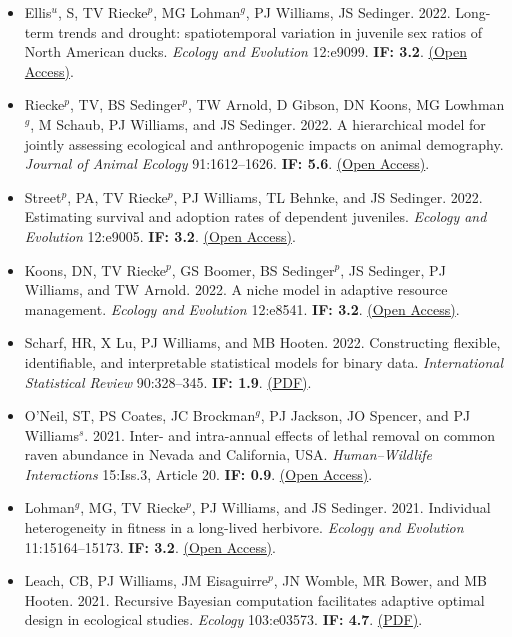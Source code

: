 \begin{itemize}
\item Ellis$^u$, S, TV Riecke$^p$, MG Lohman$^g$, PJ Williams, JS Sedinger. 2022. Long-term trends and drought: spatiotemporal variation in juvenile sex ratios of North American ducks. \emph{Ecology and Evolution} 12:e9099. \textbf{IF: 3.2}. \href{https://onlinelibrary.wiley.com/doi/10.1002/ece3.9099}{(Open Access)}.
\item Riecke$^p$, TV, BS Sedinger$^p$, TW Arnold, D Gibson, DN Koons, MG Lowhman$^g$, M Schaub, PJ Williams, and JS Sedinger. 2022. A hierarchical model for jointly assessing ecological and anthropogenic impacts on animal demography. \emph{Journal of Animal Ecology} 91:1612--1626. \textbf{IF: 5.6}. \href{https://besjournals.onlinelibrary.wiley.com/doi/10.1111/1365-2656.13747}{(Open Access)}.
\item Street$^p$, PA, TV Riecke$^p$, PJ Williams, TL Behnke, and JS Sedinger. 2022. Estimating survival and adoption rates of dependent juveniles. \emph{Ecology and Evolution} 12:e9005. \textbf{IF: 3.2}. \href{https://onlinelibrary.wiley.com/doi/10.1002/ece3.9005}{(Open Access)}.
\item Koons, DN, TV Riecke$^p$, GS Boomer, BS Sedinger$^p$, JS Sedinger, PJ Williams, and TW Arnold. 2022. A niche model in adaptive resource management. \emph{Ecology and Evolution} 12:e8541. \textbf{IF: 3.2}. \href{https://onlinelibrary.wiley.com/doi/10.1002/ece3.8541}{(Open Access)}.
\item Scharf, HR, X Lu, PJ Williams, and MB Hooten. 2022. Constructing flexible, identifiable, and interpretable statistical models for binary data. \emph{International Statistical Review} 90:328--345. \textbf{IF: 1.9}. \href{http://www.perrywilliams.us/wp-content/uploads/2023/05/scharf2022constructing.pdf}{(PDF)}.
\item O’Neil, ST, PS Coates, JC Brockman$^g$, PJ Jackson, JO Spencer, and PJ Williams$^s$. 2021. Inter- and intra-annual effects of lethal removal on common raven abundance in Nevada and California, USA. \emph{Human--Wildlife Interactions} 15:Iss.3, Article 20. \textbf{IF: 0.9}. \href{https://doi.org/10.26077/p79d-en84}{(Open Access)}.
\item Lohman$^g$, MG, TV Riecke$^p$, PJ Williams, and JS Sedinger. 2021. Individual heterogeneity in fitness in a long-lived herbivore. \emph{Ecology and Evolution} 11:15164--15173. \textbf{IF: 3.2}. \href{https://onlinelibrary.wiley.com/doi/10.1002/ece3.8197}{(Open Access)}.
\item Leach, CB, PJ Williams, JM Eisaguirre$^p$, JN Womble, MR Bower, and MB Hooten. 2021. Recursive Bayesian computation facilitates adaptive optimal design in ecological studies. \emph{Ecology} 103:e03573. \textbf{IF: 4.7}. \href{http://www.perrywilliams.us/wp-content/uploads/2023/05/leach2021recurrsive.pdf}{(PDF)}.

\end{itemize}
